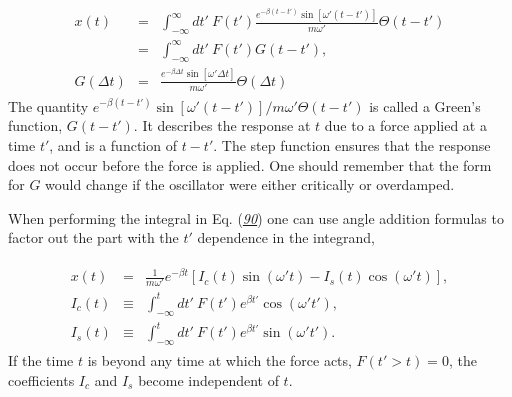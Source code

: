\documentclass[letterpaper,10pt,english]{sphinxmanual}
\begin{document}
\begin{equation*}
\begin{split}
\begin{eqnarray}\label{eq:Greeny} \tag{90}
x(t)&=&\int_{-\infty}^\infty dt'~F(t')\frac{e^{-\beta(t-t')}\sin[\omega'(t-t')]}{m\omega'}\Theta(t-t')\\
\nonumber
&=&\int_{-\infty}^\infty dt'~F(t')G(t-t'),\\
\nonumber
G(\Delta t)&=&\frac{e^{-\beta\Delta t}\sin[\omega' \Delta t]}{m\omega'}\Theta(\Delta t)
\end{eqnarray}
\end{split}
\end{equation*}
The quantity
\(e^{-\beta(t-t')}\sin[\omega'(t-t')]/m\omega'\Theta(t-t')\) is called a
Green’s function, \(G(t-t')\). It describes the response at \(t\) due to a
force applied at a time \(t'\), and is a function of \(t-t'\). The step
function ensures that the response does not occur before the force is
applied. One should remember that the form for \(G\) would change if the
oscillator were either critically\sphinxhyphen{} or over\sphinxhyphen{}damped.

When performing the integral in Eq. ({\hyperref[\detokenize{chapter1:eq:Greeny}]{\emph{90}}}) one can use
angle addition formulas to factor out the part with the \(t'\)
dependence in the integrand,




\begin{equation*}
\begin{split}
\begin{eqnarray}
\label{eq:Greeny2} \tag{91}
x(t)&=&\frac{1}{m\omega'}e^{-\beta t}\left[I_c(t)\sin(\omega't)-I_s(t)\cos(\omega't)\right],\\
\nonumber
I_c(t)&\equiv&\int_{-\infty}^t dt'~F(t')e^{\beta t'}\cos(\omega't'),\\
\nonumber
I_s(t)&\equiv&\int_{-\infty}^t dt'~F(t')e^{\beta t'}\sin(\omega't').
\end{eqnarray}
\end{split}
\end{equation*}
If the time \(t\) is beyond any time at which the force acts,
\(F(t'>t)=0\), the coefficients \(I_c\) and \(I_s\) become independent of
\(t\).
\end{document}
